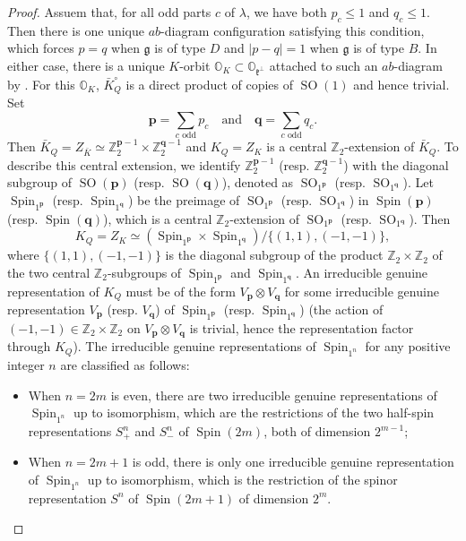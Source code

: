 \documentclass[11pt, a4paper]{amsart}
\newcommand{\orb}{\mathbb{O}}
\newcommand{\orbk}{\orb_{K}}
\newcommand{\Z}{\mathbb{Z}}
\newcommand{\fg}{\mathfrak{g}}
\newcommand{\fk}{\mathfrak{k}}
\newcommand{\SO}{\operatorname{SO}}
\newcommand{\Spin}{\operatorname{Spin}}
\theoremstyle{definition}
\numberwithin{equation}{section}
\begin{document}
\begin{proof}
	Assuem that, for all odd parts $c$ of $\lambda$, we have both $p_c \leqslant 1$ and $q_c \leqslant 1$. Then there is one unique $ab$-diagram configuration satisfying this condition, which forces $p=q$ when $\fg$ is of type $D$ and $|p-q|=1$ when $\fg$ is of type $B$. In either case, there is a unique $K$-orbit $\orbk \subset \orb_{\fk^\perp}$ attached to such an $ab$-diagram by \cite[Theorem 9.3.4]{CM}. For this $\orbk$, $\bar{K}_Q^\circ$ is a direct product of copies of $\SO(1)$ and hence trivial. Set 
		\[ \mathbf{p} = \sum_{c \text{ odd}} p_c \quad \text{and} \quad \mathbf{q} = \sum_{c \text{ odd}} q_c. \]
	Then $\bar{K}_Q = Z_{\bar{K}} \simeq \Z_2^{\mathbf{p}-1} \times \Z_2^{\mathbf{q}-1}$ and $K_Q = Z_K$ is a central $\Z_2$-extension of $\bar{K}_Q$. To describe this central extension, we identify $\Z_2^{\mathbf{p}-1}$ (resp. $\Z_2^{\mathbf{q}-1}$) with the diagonal subgroup of $\SO(\mathbf{p})$ (resp. $\SO(\mathbf{q})$), denoted as $\SO_{1^{\mathbf{p}}}$ (resp. $\SO_{1^{\mathbf{q}}}$). Let $\Spin_{1^{\mathbf{p}}}$ (resp. $\Spin_{1^{\mathbf{q}}}$) be the preimage of $\SO_{1^{\mathbf{p}}}$ (resp. $\SO_{1^{\mathbf{q}}}$) in $\Spin(\mathbf{p})$ (resp. $\Spin(\mathbf{q})$), which is a central $\Z_2$-extension of $\SO_{1^{\mathbf{p}}}$ (resp. $\SO_{1^{\mathbf{q}}}$). Then 
		\[ K_Q = Z_K \simeq (\Spin_{1^{\mathbf{p}}} \times \Spin_{1^{\mathbf{q}}}) / \{(1, 1), (-1, -1)\}, \]
	where $\{(1, 1), (-1, -1)\}$ is the diagonal subgroup of the product $\Z_2 \times \Z_2$ of the two central $\Z_2$-subgroups of $\Spin_{1^{\mathbf{p}}}$ and $\Spin_{1^{\mathbf{q}}}$.
	An irreducible genuine representation of $K_Q$ must be of the form $V_{\mathbf{p}} \otimes V_{\mathbf{q}}$ for some irreducible genuine representation $V_{\mathbf{p}}$ (resp. $V_{\mathbf{q}}$) of $\Spin_{1^{\mathbf{p}}}$ (resp. $\Spin_{1^{\mathbf{q}}}$) (the action of $(-1,-1) \in \Z_2 \times \Z_2$ on $V_{\mathbf{p}} \otimes V_{\mathbf{q}}$ is trivial, hence the representation factor through $K_Q$). The irreducible genuine representations of $\Spin_{1^n}$ for any positive integer $n$ are classified as follows:
	\begin{itemize}[itemindent=*, leftmargin=*]
		\item When $n=2m$ is even, there are two irreducible genuine representations of $\Spin_{1^n}$ up to isomorphism, which are the restrictions of the two half-spin representations $S_+^{n}$ and $S_-^{n}$ of $\Spin(2m)$, both of dimension $2^{m-1}$;
		\item When $n=2m+1$ is odd, there is only one irreducible genuine representation of $\Spin_{1^n}$ up to isomorphism, which is the restriction of the spinor representation $S^{n}$ of $\Spin(2m+1)$ of dimension $2^m$.

\end{itemize}
\end{proof}
\end{document}
